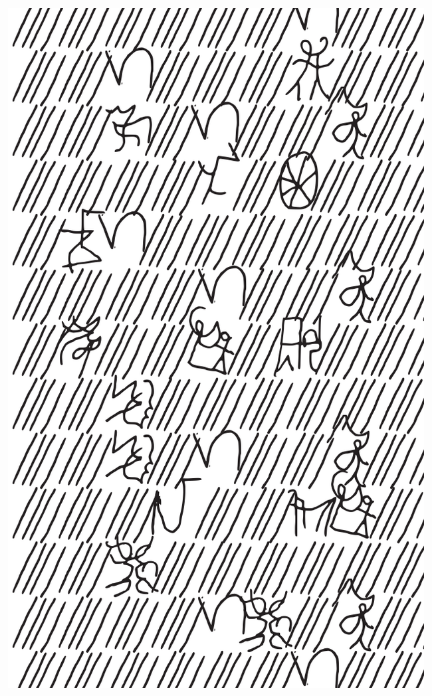 \makeatletter\@openrightfalse
\movetooddpage
\begin{absolutelynopagebreak}
\begin{vplace}
\begin{figure}[H]
\begin{adjustwidth}{-0.99cm}{}
  \centering
  \vspace*{-1.77cm}
  \hspace*{-0.45cm}
  \includegraphics[width=110mm]{./imgs/img10.pdf}  
  \hfill
\end{adjustwidth}

\thispagestyle{empty}

\end{figure}
\end{vplace}

\end{absolutelynopagebreak}

